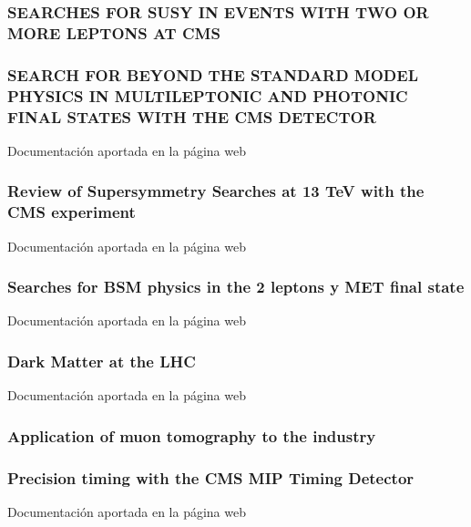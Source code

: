 \documentclass[a4paper, 11pt, twoside, openright]{report}
\begin{document}
\subsubsection{SEARCHES FOR SUSY IN EVENTS WITH TWO OR MORE LEPTONS AT CMS}

\subsubsection{SEARCH FOR BEYOND THE STANDARD MODEL PHYSICS IN MULTILEPTONIC AND PHOTONIC FINAL STATES WITH THE CMS DETECTOR}
%
Documentación aportada en la página web
\subsubsection{Review of Supersymmetry Searches at 13 TeV with the CMS experiment}
%
Documentación aportada en la página web
\subsubsection{Searches for BSM physics in the 2 leptons y MET final state}

Documentación aportada en la página web
\subsubsection{Dark Matter at the LHC}
%
Documentación aportada en la página web
\subsubsection{Application of muon tomography to the industry}

\subsubsection{Precision timing with the CMS MIP Timing Detector}
%
Documentación aportada en la página web
\end{document}
